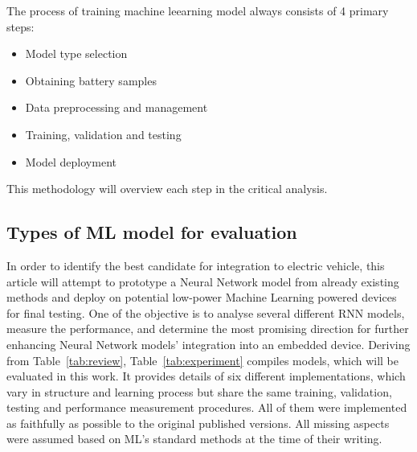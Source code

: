 The process of training machine leearning model always consists of 4 primary steps:
\begin{itemize}
    \item Model type selection \\
    \item Obtaining battery samples \\
    \item Data preprocessing and management \\
    \item Training, validation and testing \\
    \item Model deployment \\
\end{itemize}
This methodology will overview each step in the critical analysis.
\subsection{Types of ML model for evaluation}
In order to identify the best candidate for integration to electric vehicle, this article will attempt to prototype a Neural Network model from already existing methods and deploy on potential low-power Machine Learning powered devices for final testing.
One of the objective is to analyse several different RNN models, measure the performance, and determine the most promising direction for further enhancing Neural Network models' integration into an embedded device.
Deriving from \mbox{Table~\ref{tab:review}}, \mbox{Table~\ref{tab:experiment}} compiles models, which will be evaluated in this work.
It provides details of six different implementations, which vary in structure and learning process but share the same training, validation, testing and performance measurement procedures.
All of them were implemented as faithfully as possible to the original published versions.
All missing aspects were assumed based on ML's standard methods at the time of their writing.
